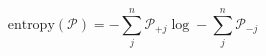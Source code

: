 \begin{equation}
\text{entropy}(\mathcal P) = -\sum_j^n\mathcal P_{+j}\log -\sum_j^n\mathcal P_{-j}
\end{equation}
